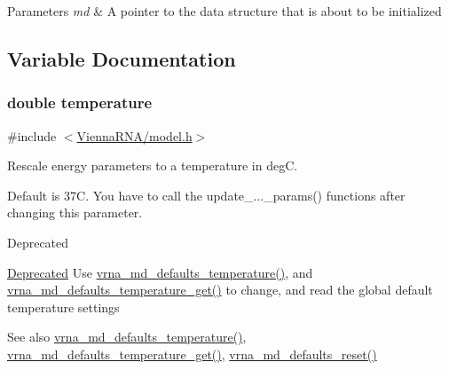 \begin{DoxyParams}{Parameters}
{\em md} & A pointer to the data structure that is about to be initialized \\
\hline
\end{DoxyParams}


\subsection{Variable Documentation}
\hypertarget{group__model__details_gab4b11c8d9c758430960896bc3fe82ead}{}
\subsubsection[{temperature}]{\setlength{\rightskip}{0pt plus 5cm}double temperature}\label{group__model__details_gab4b11c8d9c758430960896bc3fe82ead}


{\ttfamily \#include $<$\hyperlink{model_8h}{Vienna\+R\+N\+A/model.\+h}$>$}



Rescale energy parameters to a temperature in deg\+C. 

Default is 37\+C. You have to call the update\+\_\+...\+\_\+params() functions after changing this parameter. \begin{DoxyRefDesc}{Deprecated}
\item[\hyperlink{deprecated__deprecated000088}{Deprecated}]Use \hyperlink{group__model__details_gaf9e527e9a2f7e6fd6e42bc6e602f5445}{vrna\+\_\+md\+\_\+defaults\+\_\+temperature()}, and \hyperlink{group__model__details_ga96b24a74437f9ba46c4e06343155bf46}{vrna\+\_\+md\+\_\+defaults\+\_\+temperature\+\_\+get()} to change, and read the global default temperature settings \begin{DoxySeeAlso}{See also}
\hyperlink{group__model__details_gaf9e527e9a2f7e6fd6e42bc6e602f5445}{vrna\+\_\+md\+\_\+defaults\+\_\+temperature()}, \hyperlink{group__model__details_ga96b24a74437f9ba46c4e06343155bf46}{vrna\+\_\+md\+\_\+defaults\+\_\+temperature\+\_\+get()}, \hyperlink{group__model__details_ga70834424cf804d149937de89f80ceb45}{vrna\+\_\+md\+\_\+defaults\+\_\+reset()} 
\end{DoxySeeAlso}
\end{DoxyRefDesc}
\hypertarget{group__model__details_gad3b22044065acc6dee0af68931b52cfd}{}
